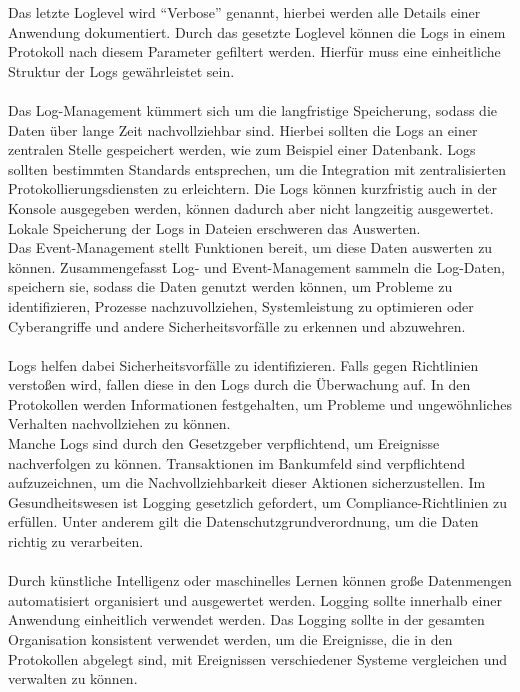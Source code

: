 Das letzte Loglevel wird \enquote{Verbose} genannt, hierbei werden alle Details einer Anwendung dokumentiert.
Durch das gesetzte Loglevel können die Logs in einem Protokoll nach diesem Parameter gefiltert werden.
Hierfür muss eine einheitliche Struktur der Logs gewährleistet sein.
\\
\\
Das Log-Management kümmert sich um die langfristige Speicherung, sodass die Daten über lange Zeit nachvollziehbar sind.
Hierbei sollten die Logs an einer zentralen Stelle gespeichert werden, wie zum Beispiel einer Datenbank.
Logs sollten bestimmten Standards entsprechen, um die Integration mit zentralisierten Protokollierungsdiensten zu erleichtern.
Die Logs können kurzfristig auch in der Konsole ausgegeben werden, können dadurch aber nicht langzeitig ausgewertet.
Lokale Speicherung der Logs in Dateien erschweren das Auswerten.
\\
Das Event-Management stellt Funktionen bereit, um diese Daten auswerten zu können.
Zusammengefasst Log- und Event-Management sammeln die Log-Daten, speichern sie, sodass die Daten genutzt werden können, um Probleme zu identifizieren, Prozesse nachzuvollziehen, Systemleistung zu optimieren oder Cyberangriffe und andere Sicherheitsvorfälle zu erkennen und abzuwehren.
\\
\\
Logs helfen dabei Sicherheitsvorfälle zu identifizieren.
Falls gegen Richtlinien verstoßen wird, fallen diese in den Logs durch die Überwachung auf.
In den Protokollen werden Informationen festgehalten, um Probleme und ungewöhnliches Verhalten nachvollziehen zu können.
\\
Manche Logs sind durch den Gesetzgeber verpflichtend, um Ereignisse nachverfolgen zu können.
Transaktionen im Bankumfeld sind verpflichtend aufzuzeichnen, um die Nachvollziehbarkeit dieser Aktionen sicherzustellen.
Im Gesundheitswesen ist Logging gesetzlich gefordert, um Compliance-Richtlinien zu erfüllen.
Unter anderem gilt die Datenschutzgrundverordnung, um die Daten richtig zu verarbeiten.
\\
\\
Durch künstliche Intelligenz oder maschinelles Lernen können große Datenmengen automatisiert organisiert und ausgewertet werden.
Logging sollte innerhalb einer Anwendung einheitlich verwendet werden.
Das Logging sollte in der gesamten Organisation konsistent verwendet werden, um die Ereignisse, die in den Protokollen abgelegt sind, mit Ereignissen verschiedener Systeme vergleichen und verwalten zu können.
